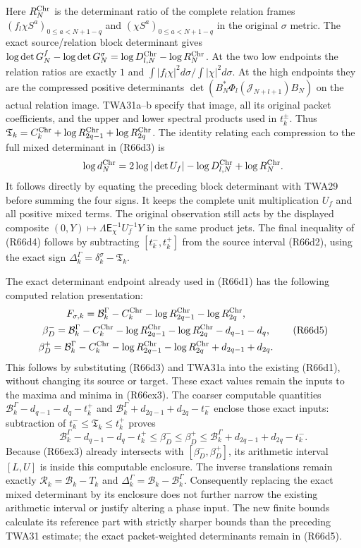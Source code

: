 Here $R_N^{\rm Chr}$ is the determinant ratio of the complete
relation frames $(f_l\chi S^a)_{0\leq a<N+1-q}$ and
$(\chi S^a)_{0\leq a<N+1-q}$ in the original $\sigma$ metric.
The exact source/relation block determinant gives
$\log\det G_N^f-\log\det G_N^\sigma
=\log D_{l,N}^{\rm Chr}-\log R_N^{\rm Chr}$.
At the two low endpoints the relation ratios are exactly
$1$ and $\int|f_l\chi|^2d\sigma/\int|\chi|^2d\sigma$.
At the high endpoints they are the compressed positive
determinants $\det(B_N^*\Phi_l(\mathcal J_{N+l+1})B_N)$
on the actual relation image. TWA31a--b specify that image,
all its original packet coefficients, and the upper and
lower spectral products used in $t_k^\pm$.
Thus $\mathfrak T_k=C_k^{\rm Chr}
+\log R_{2q-1}^{\rm Chr}+\log R_{2q}^{\rm Chr}$.
The identity relating each compression to the full mixed
determinant in (R66d3) is
\[
 \log d_N^{\rm Chr}=2\log|\det U_f|
                 -\log D_{l,N}^{\rm Chr}+\log R_N^{\rm Chr}.
\]
It follows directly by equating the preceding block
determinant with TWA29 before summing the four signs.
It keeps the complete unit multiplication $U_f$ and all
positive mixed terms. The original observation still acts
by the displayed composite $(0,Y)\mapsto
\Lambda\mathsf E_\chi^{-1}U_f^{-1}Y$ in the same product jets.
The final inequality of (R66d4) follows by subtracting
$[t_k^-,t_k^+]$ from the source interval (R66d2), using
the exact sign $\Delta_k^\Gamma=\delta_k^\sigma-\mathfrak T_k$.

The exact determinant endpoint already used in (R66d1)
has the following computed relation presentation:
\[
\begin{gathered}
 F_{\sigma,k}=\mathcal B_k^\Gamma-C_k^{\rm Chr}
                 -\log R_{2q-1}^{\rm Chr}-\log R_{2q}^{\rm Chr},\\
 \beta_D^-=\mathcal B_k^\Gamma-C_k^{\rm Chr}
 -\log R_{2q-1}^{\rm Chr}-\log R_{2q}^{\rm Chr}-d_{q-1}-d_q,\\
 \beta_D^+=\mathcal B_k^\Gamma-C_k^{\rm Chr}
 -\log R_{2q-1}^{\rm Chr}-\log R_{2q}^{\rm Chr}+d_{2q-1}+d_{2q}.
\end{gathered}\tag{R66d5}
\]
This follows by substituting (R66d3) and TWA31a into the
existing (R66d1), without changing its source or target.
These exact values remain the inputs to the maxima and
minima in (R66ex3). The coarser computable quantities
$\mathcal B_k^\Gamma-d_{q-1}-d_q-t_k^+$ and
$\mathcal B_k^\Gamma+d_{2q-1}+d_{2q}-t_k^-$
enclose those exact inputs: subtraction of
$t_k^-\leq\mathfrak T_k\leq t_k^+$ proves
\[
 \mathcal B_k^\Gamma-d_{q-1}-d_q-t_k^+
 \leq\beta_D^-\leq\beta_D^+
 \leq\mathcal B_k^\Gamma+d_{2q-1}+d_{2q}-t_k^-.
\]
Because (R66ex3) already intersects with
$[\beta_D^-,\beta_D^+]$, its arithmetic interval
$[L,U]$ is inside this computable enclosure.
The inverse translations remain exactly
$\mathcal R_k=\mathcal B_k-T_k$ and
$\Delta_k^\Gamma=\mathcal B_k-\mathcal B_k^\Gamma$.
Consequently replacing the exact mixed determinant by
its enclosure does not further narrow the existing
arithmetic interval or justify altering a phase input.
The new finite bounds calculate its reference part with
strictly sharper bounds than the preceding TWA31 estimate;
the exact packet-weighted determinants remain in (R66d5).

